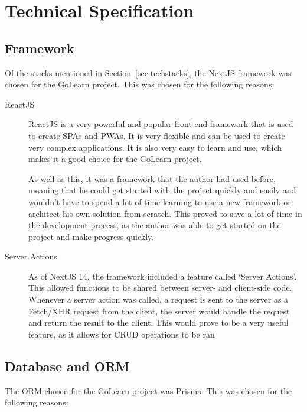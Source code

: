 \documentclass[12pt, a4paper,twoside]{report}
\theoremstyle{plain} %
\theoremstyle{definition} %
\numberwithin{equation}{chapter}
\begin{document}
\chapter{Technical Specification}\label{ch:techspec}

\section{Framework}\label{sec:framework}

Of the stacks mentioned in Section~\ref{sec:techstacks}, the NextJS framework
was chosen for the GoLearn project. This was chosen for the following reasons:

\begin{description}
    \item[ReactJS\cite{what-is-react}] {
        ReactJS is a very powerful and popular front-end framework that is
        used to create SPAs and PWAs. It is very flexible and can be used to
        create very complex applications. It is also very easy to learn and
        use, which makes it a good choice for the GoLearn project.

        As well as this, it was a framework that the author had used before,
        meaning that he could get started with the project quickly and easily
        and wouldn't have to spend a lot of time learning to use a new framework
        or architect his own solution from scratch. This proved to save a lot
        of time in the development process, as the author was able to get started
        on the project and make progress quickly.
        }
    \item[Server Actions\cite{next-server-action}] {
        As of NextJS 14, the framework included a feature called `Server Actions'.
        This allowed functions to be shared between server- and client-side code.
        Whenever a server action was called, a request is sent to the server as a
        Fetch/XHR request from the client, the server would handle the request and
        return the result to the client. This would prove to be a very useful feature,
        as it allows for CRUD operations to be ran
        }
\end{description}

\section{Database and ORM}\label{sec:databaseorm}

The ORM chosen for the GoLearn project was Prisma. This was chosen for the
following reasons:
\end{document}
